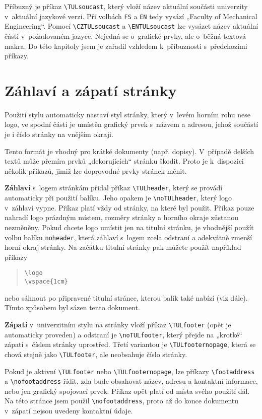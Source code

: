 \documentclass[a4paper,12pt,twoside]{article}
\newcommand{\cmdfont}[1]{\texttt{\color{\tulcolor}#1}}
\newcommand{\cmd}[1]{\cmdfont{\textbackslash #1}}
\begin{document}
Příbuzný je příkaz \cmd{TULsoucast}, který vloží název aktuální součásti
univerzity v~aktuální jazykové verzi. Při volbách \cmdfont{FS} a \cmdfont{EN}
tedy vysází „Faculty of Mechanical Engineering“. Pomocí \cmd{CZTULsoucast} a
\cmd{ENTULsoucast} lze vysázet název aktuální části v~požadovaném jazyce.
Nejedná se o~grafické prvky, ale o~běžná textová makra. Do této kapitoly jsem
je zařadil vzhledem k~příbuznosti s~předchozími příkazy.


\section{Záhlaví a zápatí stránky}

Použití stylu automaticky nastaví styl stránky, který v~levém horním rohu nese
logo, ve spodní části je umístěn grafický prvek s~názvem a adresou, jehož
součástí je i číslo stránky na vnějším okraji.

Tento formát je vhodný pro krátké dokumenty (např. dopisy). V~případě delších
textů může přemíra prvků „dekorujících“ stránku škodit. Proto je k~dispozici
několik příkazů, jimiž lze doprovodné prvky stránek měnit.

\textbf{Záhlaví} s~logem stránkám přidal příkaz \cmd{TULheader}, který se
provádí automaticky při použití balíku. Jeho opakem je \cmd{noTULheader}, který
logo v~záhlaví vypne. Příkaz platí vždy od stránky, na které byl použit. Příkaz
pouze nahradí logo prázdným místem, rozměry stránky a horního okraje zůstanou
nezměněny. Pokud chcete logo umístit jen na titulní stránku, je vhodnější
použít volbu balíku \cmdfont{noheader}, která záhlaví s~logem zcela odstraní a
adekvátně zmenší horní okraj stránky. Na začátku titulní stránky pak můžete
použít například příkazy

\begin{quote}
\cmd{logo}\\
\cmd{vspace\{1cm\}}
\end{quote}

nebo sáhnout po připravené titulní stránce, kterou balík také nabízí (viz
dále). Tímto způsobem byl sázen tento dokument.

\textbf{Zápatí} v~univerzitním stylu na stránky vloží příkaz \cmd{TULfooter}
(opět je automaticky proveden) a odstraní je \cmd{noTULfooter}, který přejde na
„krotké“ zápatí s~číslem stránky uprostřed. Třetí variantou je
\cmd{TULfooternopage}, která se chová stejně jako \cmd{TULfooter}, ale
neobsahuje číslo stránky.

Pokud je aktivní \cmd{TULfooter} nebo \cmd{TULfooternopage}, lze příkazy
\cmd{footaddress} a \cmd{nofootaddress} řídit, zda bude obsahovat název, adresu
a kontaktní informace, nebo jen grafický spojovací prvek. Příkaz opět platí od
místa svého použití dál. Na této stránce jsem použil \cmd{nofootaddress}, proto
až do konce dokumentu v~zápatí nejsou uvedeny kontaktní údaje.
\nofootaddress
\end{document}
